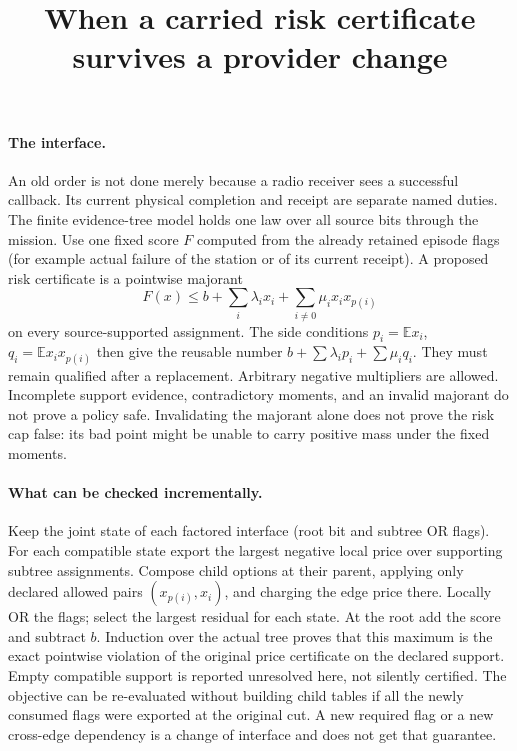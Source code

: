 \documentclass[11pt]{article}
\title{When a carried risk certificate survives a provider change}
\begin{document}
\maketitle
\paragraph{The interface.}
An old order is not done merely because a radio receiver sees a
successful callback. Its current physical completion and receipt
are separate named duties. The finite evidence-tree model holds
one law over all source bits through the mission. Use one fixed
score \(F\) computed from the already retained episode flags
(for example actual failure of the station or of its current
receipt). A proposed risk certificate is a pointwise majorant
\[
    F(x)\le b+\sum_i \lambda_i x_i+
                         \sum_{i\ne0}\mu_i x_i x_{p(i)}
\]
on every source-supported assignment. The side conditions
\(p_i=\mathbb E x_i\), \(q_i=\mathbb E x_i x_{p(i)}\) then
give the reusable number \(b+\sum\lambda_i p_i+\sum\mu_i q_i\).
They must remain qualified after a replacement. Arbitrary
negative multipliers are allowed. Incomplete support evidence,
contradictory moments, and an invalid majorant do not prove
a policy safe. Invalidating the majorant alone does not prove
the risk cap false: its bad point might be unable to carry
positive mass under the fixed moments.

\paragraph{What can be checked incrementally.}
Keep the joint state of each factored interface (root bit and
subtree OR flags). For each compatible state export the largest
negative local price over supporting subtree assignments.
Compose child options at their parent, applying only declared
allowed pairs \((x_{p(i)},x_i)\), and charging the edge price
there. Locally OR the flags; select the largest residual
for each state. At the root add the score and subtract \(b\).
Induction over the actual tree proves that this maximum is
the exact pointwise violation of the original price certificate
on the declared support. Empty compatible support is reported
unresolved here, not silently certified. The objective can
be re-evaluated without building child tables if all the
newly consumed flags were exported at the original cut.
A new required flag or a new cross-edge dependency
is a change of interface and does not get that guarantee.
\end{document}
